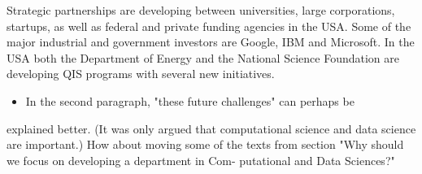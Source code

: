 \documentclass[%
oneside,                 %
final,                   %
10pt]{article}
\begin{document}
Strategic partnerships are developing between universities, large
corporations, startups, as well as federal and private funding
agencies in the USA.  Some of the major industrial and government investors are
Google, IBM and Microsoft. In the USA both the Department of Energy 
and the National Science Foundation are developing 
QIS programs with several new initiatives.


\begin{itemize}
\item In the second paragraph, "these future challenges" can perhaps be
\end{itemize}

\noindent
explained better. (It was only argued that computational science
and data science are important.) How about moving some of the
texts from section "Why should we focus on developing a
department in Com- putational and Data Sciences?"



\end{document}
